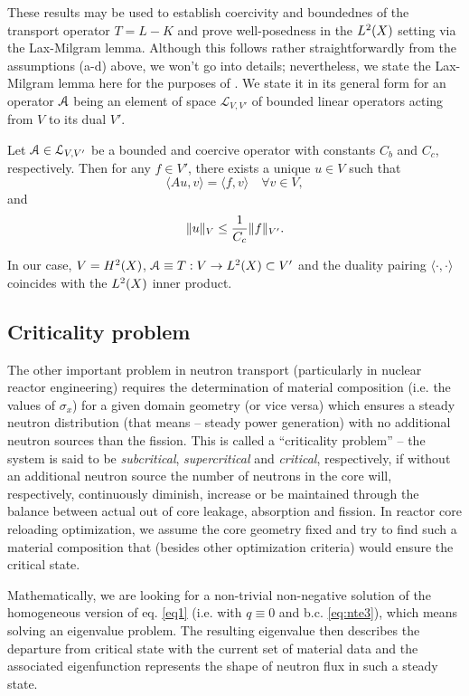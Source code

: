 These results may be used to establish coercivity and boundednes of the transport operator 
$T = L - K$ and prove well-posedness in the $\Lp[2](X)$ setting via the Lax-Milgram lemma. Although this follows rather
straightforwardly from the assumptions (a-d) above, we won't go into details; nevertheless, we state the Lax-Milgram
lemma here for the purposes of . We state it in its general form for an operator $\genop{A}$ being an 
element of space $\mathcal{L}_{V,V'}$ of bounded linear operators acting from $V$ to its dual $V'$.
\begin{lemma}
	Let $\genop{A}\in\mathcal{L}_{V,V'}$ be a bounded and coercive operator with constants $C_b$ and $C_c$, respectively.
	Then for any $f\in V'$, there exists a unique $u\in V$ such that
	$$
		\langle Au, v \rangle = \langle f, v \rangle  \quad \forall v\in V,
	$$
	and
	$$
		\norm[V]{u} \leq \frac{1}{C_c}\norm[V']{f}.
	$$
\end{lemma}
In our case, $V = \Hp[2](X)$, $\genop{A} \equiv T : V \to \Lp[2](X) \subset V'$ and the duality pairing
$\langle \cdot,\cdot\rangle$ coincides with the $\Lp[2](X)$ inner product. %


\subsection{Criticality problem}\label{sec:criticality}

The other important problem in neutron transport (particularly in nuclear reactor engineering) requires the
determination of material composition (i.e. the values of $\sigma_x$) for a given domain geometry (or vice versa)
which ensures a steady neutron distribution (that means -- steady power generation) with no additional neutron sources
than the fission. This is called a ``criticality problem'' -- the system is said to be \textit{subcritical},
\textit{supercritical} and \textit{critical}, respectively, if without an additional neutron source the number of
neutrons in the core will, respectively, continuously diminish, increase or be maintained through the
balance between actual out of core leakage, absorption and fission. In reactor core reloading optimization, we assume
the core geometry fixed and try to find such a material composition that (besides other optimization criteria) would
ensure the critical state. 

Mathematically, we are looking for a non-trivial non-negative solution of the homogeneous
version of eq. \eqref{eq1} (i.e. with $q\equiv 0$ and b.c. \eqref{eq:nte3}), which means solving an eigenvalue
problem. The resulting eigenvalue then describes the departure from critical state with the current set of material
data and the associated eigenfunction represents the shape of neutron flux in such a steady state. 

